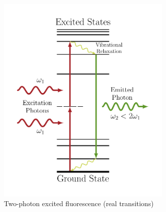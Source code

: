 \documentclass{beamer}
\begin{document}
\begin{frame}
\begin{columns}
\begin{figure}
\centering
\includegraphics[width=\textwidth]{diag-levelsflourescence}
\caption{\centering Two-photon excited fluorescence (real transitions)}
\end{figure}
\begin{figure}
\centering

\end{figure}
\end{columns}
\end{frame}
\end{document}
